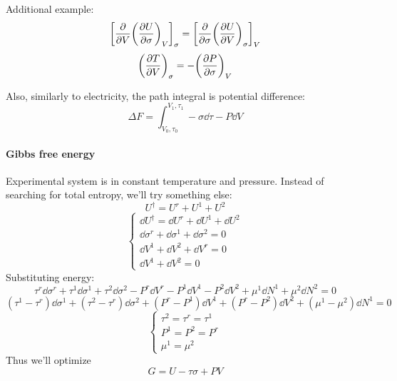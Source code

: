 Additional example:
$$\qty[\pdv{V} \qty(\pdv{U}{\sigma})_V]_\sigma =\qty[ \pdv{\sigma} \qty(\pdv{U}{V})_\sigma]_V$$
$$\qty(\pdv{T}{V})_\sigma = -\qty(\pdv{P}{\sigma})_V$$

Also, similarly to electricity, the path integral is potential difference:
$$\Delta F = \int_{V_0,\tau_0}^{V_1, \tau_1} -\sigma \dd{\tau} - P \dd{V}$$
\paragraph{Gibbs free energy}
Experimental system is in constant temperature and pressure. Instead of searching for total entropy, we'll try something else:
$$U^\dagger = U^r+U^1+U^2$$
$$\begin{cases}
\dd{U}^\dagger = \dd{U}^r + \dd{U}^1 + \dd{U}^2\\
\dd{\sigma}^r+ \dd{\sigma}^1 + \dd{\sigma}^2 = 0\\
\dd{V}^1+\dd{V}^2+\dd{V}^r = 0\\
\dd{V}^1+\dd{V}^2 = 0
\end{cases}$$
Substituting energy:
$$\tau^r\dd{\sigma}^r + \tau^1\dd{\sigma}^1 + \tau^2\dd{\sigma}^2 - P^r\dd{V}^r  - P^1\dd{V}^1  - P^2\dd{V}^2 + \mu^1 \dd{N}^1 + \mu^2 \dd{N}^2 = 0$$
$$(\tau^1-\tau^r)\dd{\sigma}^1 + (\tau^2-\tau^r)\dd{\sigma}^2 + (P^r-P^1) \dd{V}^1 + (P^r-P^2) \dd{V}^2 + (\mu^1-\mu^2)\dd{N}^1 = 0$$
$$\begin{cases}
\tau^2=\tau^r=\tau^1\\P^1=P^2=P^r\\\mu^1=\mu^2
\end{cases}$$
Thus we'll optimize
$$G=U-\tau\sigma+PV$$
